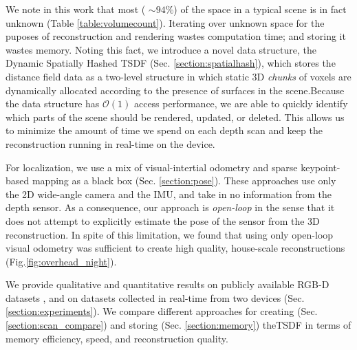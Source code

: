 \documentclass[10pt,twocolumn,letterpaper]{article}
\newcommand{\figref}[1]{Fig.\ref{#1}}
\begin{document}
We note in this work that most ( $\sim 94\%$) of the space in a typical scene is
in fact unknown (Table \ref{table:volumecount}). Iterating over unknown space for the
puposes of reconstruction and rendering wastes computation time; and storing it
wastes memory. Noting this fact, we introduce a novel data structure, the
Dynamic Spatially Hashed \cite{SpatialHashing} TSDF (Sec. \ref{section:spatialhash}),
which stores the distance field data as a two-level structure in which static
3D \textit{chunks} of voxels are dynamically allocated according to the
presence of surfaces in the scene.Because the data structure has
$\mathcal{O}(1)$ access performance, we are able to quickly identify which
parts of the scene should be rendered, updated, or deleted. This allows us to
minimize the amount of time we spend on each depth scan and keep the
reconstruction running in real-time on the device.

For localization, we use a mix of  visual-intertial odometry \cite{VINS} and
sparse keypoint-based mapping \cite{FastSlam} as a black box (Sec.
\ref{section:pose}). These approaches use only the 2D wide-angle camera and the
IMU, and take in no information from the depth sensor. As a consequence, our
approach is \textit{open-loop} in the sense that it does not attempt to explicitly estimate the pose of the sensor
from the 3D reconstruction. In spite of this limitation, we found that
using only open-loop visual odometry was sufficient to create high quality,
house-scale reconstructions (\figref{fig:overhead_night}).

 We provide qualitative and  quantitative results on publicly available RGB-D
 datasets \cite{FREIBURG}, and on datasets collected in real-time from two
 devices (Sec. \ref{section:experiments}). We compare different approaches for
 creating (Sec. \ref{section:scan_compare}) and storing (Sec.
 \ref{section:memory}) theTSDF in terms of memory efficiency, speed, and
 reconstruction quality.
\end{document}
